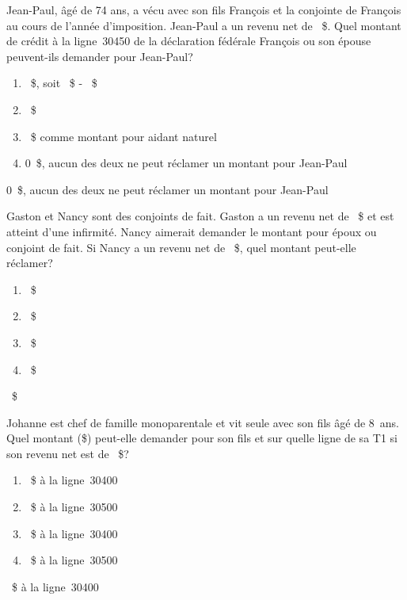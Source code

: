 \begin{question}
	Jean-Paul, âgé de 74 ans, a vécu avec son fils François et la conjointe de François au cours de l'année d'imposition. Jean-Paul a un revenu net de ~\$. Quel montant de crédit à la ligne~30450 de la déclaration fédérale François ou son épouse peuvent-ils demander pour Jean-Paul?
	\begin{enumerate}[label=\Alph*.]
		\item {}~\$, soit ~\$ - ~\$ 
		\item {}~\$
		\item {}~\$ comme montant pour aidant naturel
		\item 0~\$, aucun des deux ne peut réclamer un montant pour Jean-Paul
	\end{enumerate}
\end{question}
0~\$, aucun des deux ne peut réclamer un montant pour Jean-Paul

\begin{question}
	Gaston et Nancy sont des conjoints de fait. Gaston a un revenu net de ~\$ et est atteint d'une infirmité. Nancy aimerait demander le montant pour époux ou conjoint de fait. Si Nancy a un revenu net de ~\$, quel montant peut-elle réclamer?
	\begin{enumerate}[label=\Alph*.]
		\item {}~\$
		\item {}~\$
		\item {}~\$
		\item {}~\$
	\end{enumerate}
\end{question}
~\$

\begin{question}
	Johanne est chef de famille monoparentale et vit seule avec son fils âgé de 8~ans. Quel montant (\$) peut-elle demander pour son fils et sur quelle ligne de sa T1 si son revenu net est de ~\$?
	\begin{enumerate}[label=\Alph*.]
		\item {}~\$ à la ligne~30400
		\item {}~\$ à la ligne~30500
		\item {}~\$ à la ligne~30400
		\item {}~\$ à la ligne~30500
	\end{enumerate}
\end{question}
~\$ à la ligne~30400

